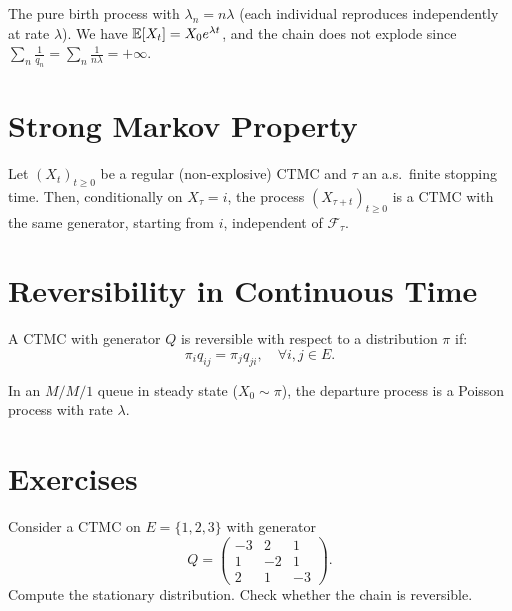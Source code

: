 \begin{example}
The pure birth process with $\lambda_n = n\lambda$ (each individual reproduces
independently at rate $\lambda$). We have $\mathbb{E}[X_t] = X_0 e^{\lambda t}$, and the
chain does not explode since $\sum_n \frac{1}{q_n} = \sum_n \frac{1}{n\lambda} = +\infty$.
\end{example}

\section{Strong Markov Property}

\begin{theorem}
\label{thm:strong_markov_ct}
Let $(X_t)_{t \geq 0}$ be a regular (non-explosive) CTMC and $\tau$ an a.s.\
finite stopping time. Then, conditionally on $X_{\tau} = i$, the process
$(X_{\tau + t})_{t \geq 0}$ is a CTMC with the same generator, starting from $i$,
independent of $\mathcal{F}_{\tau}$.
\end{theorem}

\section{Reversibility in Continuous Time}

\begin{definition}[Reversibility]
A CTMC with generator $Q$ is reversible with respect to a distribution $\pi$ if:
\[
  \pi_i q_{ij} = \pi_j q_{ji}, \quad \forall i, j \in E.
\]
\end{definition}

\begin{theorem}
\label{thm:burke}
In an $M/M/1$ queue in steady state ($X_0 \sim \pi$), the departure process is
a Poisson process with rate $\lambda$.
\end{theorem}

\section{Exercises}

\begin{exercise}
Consider a CTMC on $E = \{1, 2, 3\}$ with generator
\[
  Q = \begin{pmatrix} -3 & 2 & 1 \\ 1 & -2 & 1 \\ 2 & 1 & -3 \end{pmatrix}.
\]
Compute the stationary distribution. Check whether the chain is reversible.
\end{exercise}

